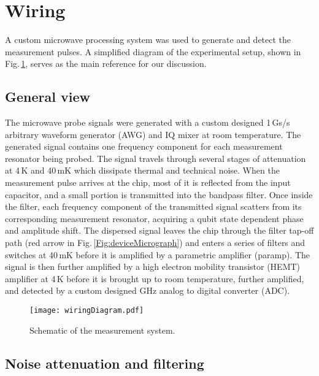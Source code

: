 \section{Wiring}

A custom microwave processing system was used to generate and detect the measurement pulses.
A simplified diagram of the experimental setup, shown in Fig.\,\ref{Fig:wiring}, serves as the main reference for our discussion.

\subsection{General view}

The microwave probe signals were generated with a custom designed 1\,Gs/s arbitrary waveform generator (AWG) and IQ mixer at room temperature.
The generated signal contains one frequency component for each measurement resonator being probed.
The signal travels through several stages of attenuation at 4\,K and 40\,mK which dissipate thermal and technical noise.
When the measurement pulse arrives at the chip, most of it is reflected from the input capacitor, and a small portion is transmitted into the bandpass filter.
Once inside the filter, each frequency component of the transmitted signal scatters from its corresponding measurement resonator, acquiring a qubit state dependent phase and amplitude shift.
The dispersed signal leaves the chip through the filter tap-off path (red arrow in Fig.\,\ref{Fig:deviceMicrograph}) and enters a series of filters and switches at 40\,mK before it is amplified by a parametric amplifier (paramp).
The signal is then further amplified by a high electron mobility transistor (HEMT) amplifier at 4\,K before it is brought up to room temperature, further amplified, and detected by a custom designed GHz analog to digital converter (ADC).

\begin{figure}
\begin{centering}
\texttt{[image: wiringDiagram.pdf]} 
\par\end{centering}
\caption{Schematic of the measurement system.}
\label{Fig:wiring}
\end{figure}

\subsection{Noise attenuation and filtering}

